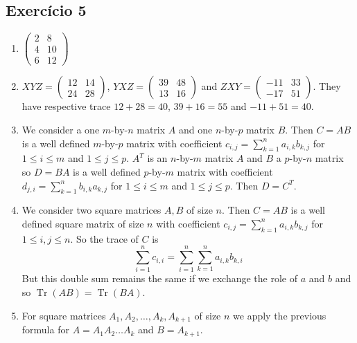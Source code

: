 \subsection*{Exercício 5}

\begin{enumerate}
\item $\begin{pmatrix}
      2 & 8  \\
      4 & 10  \\
      6 & 12
\end{pmatrix}$
\item $XYZ = \begin{pmatrix}
      12 & 14  \\
      24 & 28
\end{pmatrix}$, $YXZ = \begin{pmatrix}
      39 & 48  \\
      13 & 16
\end{pmatrix}$ and $ZXY = \begin{pmatrix}
      -11 & 33  \\
      -17 & 51
\end{pmatrix}$. They have respective trace $12+28=40$, $39+16=55$ and
  $-11+51=40$.
\item We consider a one $m$-by-$n$ matrix $A$ and one $n$-by-$p$ matrix $B$.
  Then $C=AB$ is a well defined $m$-by-$p$ matrix with coefficient
  $c_{i,j} = \sum_{k=1}^n a_{i,k} b_{k,j}$
  for $1\leq i \leq m$ and $1\leq j \leq p$.
  $A^T$ is an $n$-by-$m$ matrix $A$ and $B$ a $p$-by-$n$ matrix so
  $D=BA$  is a well defined $p$-by-$m$ matrix with coefficient
  $d_{j,i} = \sum_{k=1}^n b_{i,k} a_{k,j}$
  for $1\leq i \leq m$ and $1\leq j \leq p$. Then $D = C^T$.

\item We consider two square matrices $A,B$ of size $n$. Then
  $C=AB$ is a well defined square matrix of size $n$ with coefficient
  $c_{i,j} = \sum_{k=1}^n a_{i,k} b_{k,j}$
  for $1\leq i,j \leq n$. So the trace of $C$ is
  $$\sum_{i=1}^n c_{i,i} = \sum_{i=1}^n {\sum_{k=1}^n a_{i,k} b_{k,i}}$$
  But this double sum remains the same if we exchange the role of $a$ and $b$
  and so $\operatorname{Tr}(A B) = \operatorname{Tr}(B A)$.
\item
  For square matrices $A_1,A_2,\dots,A_k,A_{k+1}$
  of size $n$ we apply the previous formula for $A = A_1 A_2 \dots A_k$ and
  $B = A_{k+1}$.
\end{enumerate}

